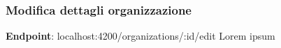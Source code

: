 \documentclass[../manuale-utente.tex]{subfiles}
\begin{document}
\subsubsection{Modifica dettagli organizzazione}%
\label{subs:modififica-dettagli-organizzazione}


\textbf{Endpoint}: localhost:4200/organizations/:id/edit
Lorem ipsum
\newpage

\end{document}
